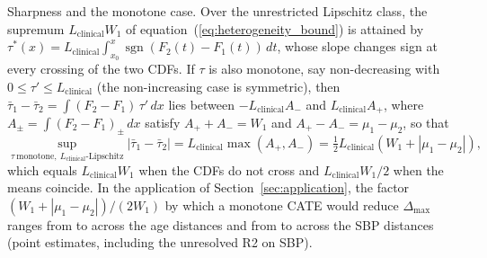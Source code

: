 \documentclass[AMA,Times1COL]{WileyNJDv5}
\begin{document}
Sharpness and the monotone case. Over the unrestricted Lipschitz class, the supremum $L_{\text{clinical}} W_1$ of equation~(\ref{eq:heterogeneity_bound}) is attained by $\tau^*(x) = L_{\text{clinical}} \int_{x_0}^{x} \operatorname{sgn}(F_2(t) - F_1(t))\,dt$, whose slope changes sign at every crossing of the two CDFs. If $\tau$ is also monotone, say non-decreasing with $0 \leq \tau' \leq L_{\text{clinical}}$ (the non-increasing case is symmetric), then $\bar{\tau}_1 - \bar{\tau}_2 = \int (F_2 - F_1)\,\tau'\,dx$ lies between $-L_{\text{clinical}} A_-$ and $L_{\text{clinical}} A_+$, where $A_\pm = \int (F_2 - F_1)_\pm\,dx$ satisfy $A_+ + A_- = W_1$ and $A_+ - A_- = \mu_1 - \mu_2$, so that
\begin{equation}
\sup_{\tau\ \text{monotone},\ L_{\text{clinical}}\text{-Lipschitz}} |\bar{\tau}_1 - \bar{\tau}_2| = L_{\text{clinical}} \max(A_+, A_-) = \tfrac{1}{2} L_{\text{clinical}} \left( W_1 + |\mu_1 - \mu_2| \right),
\label{eq:mono_bound}
\end{equation}
which equals $L_{\text{clinical}} W_1$ when the CDFs do not cross and $L_{\text{clinical}} W_1 / 2$ when the means coincide. In the application of Section~\ref{sec:application}, the factor $(W_1 + |\mu_1 - \mu_2|)/(2 W_1)$ by which a monotone CATE would reduce $\Delta_{\max}$ ranges from  to  across the age distances and from  to  across the SBP distances (point estimates, including the unresolved R2 on SBP).

\end{document}
